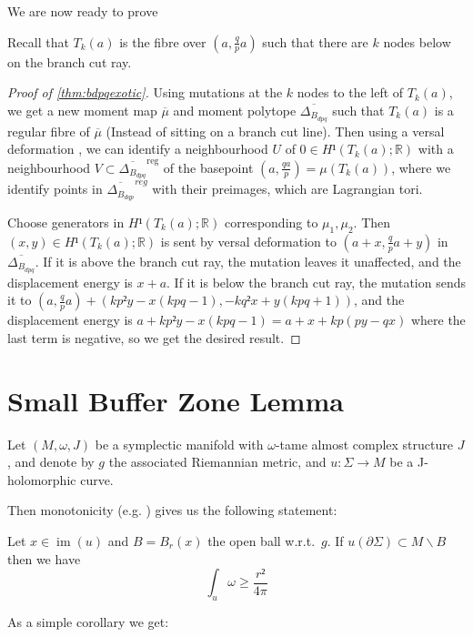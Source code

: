\documentclass[12pt,a4paper,draft]{scrartcl}
\DeclareMathOperator{\im}{im}
\begin{document}
We are now ready to prove

\thmbdpqexotic*

Recall that $T_k(a)$ is the fibre over $(a,\frac{q}{p}a)$ such that there are $k$ nodes below on the branch cut ray.

\begin{proof}[Proof of \cref{thm:bdpqexotic}]
  Using mutations at the $k$ nodes to the left of $T_k(a)$, we get a new moment map $\overline{μ}$ and moment polytope $\overline{Δ_{B_{dpq}}}$ such that $T_k(a)$ is a regular  fibre of $\overline{μ}$ (Instead of sitting on a branch cut line).
  Then using a versal deformation , we can identify a neighbourhood $U$ of $0 ∈ H¹(T_k(a);ℝ)$ with a neighbourhood $V ⊂ \overline{Δ_{B_{dpq}}}^{\text{reg}}$ of the basepoint $(a,\frac{qa}{p}) = μ(T_k(a))$, where we identify points in $\overline{Δ_{B_{dqp}}}^{reg}$ with their preimages, which are Lagrangian tori.

  Choose generators in $H¹(T_k(a);ℝ)$ corresponding to $μ_1,μ_2$. Then $(x,y) ∈ H¹(T_k(a);ℝ)$ is sent by versal deformation to $(a + x, \frac{q}{p}a + y)$ in $\overline{Δ_{B_{dpq}}}$.
  If it is above the branch cut ray, the mutation leaves it unaffected, and the displacement energy is $x+a$.
  If it is below the branch cut ray, the mutation sends it to $(a,\frac{q}{p}a) + (kp²y -x(kpq -1), -kq²x + y(kpq +1))$, and the displacement energy is $a +kp²y - x(kpq-1) = a + x + kp(py-qx)$ where the last term is negative, so we get the desired result.
\end{proof}


\section{Small Buffer Zone Lemma}

Let $(M,ω,J)$ be a symplectic manifold with $ω$-tame almost complex structure $J$, and denote by $g$ the associated Riemannian metric, and $u\colon Σ → M$ be a J-holomorphic curve.

Then monotonicity (e.g. \cite[Proposition 4.3.1 (ii)]{sikorav1994}) gives us the following statement:

\begin{lemma}[Monotonicity]
  \label{lem:monotonicity}
  Let $x ∈ \im(u)$ and $B = B_r(x)$ the open ball w.r.t.\ $g$. If $u(∂Σ) ⊂ M ∖ B$ then we have
  \[∫_u ω ≥ \frac{r²}{4π}\]
\end{lemma}

As a simple corollary we get:
\end{document}
